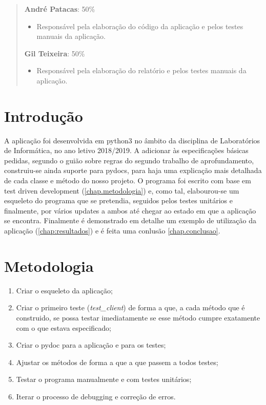 \documentclass{report}
\begin{document}
\renewcommand{\abstractname}{Contribuições dos autores}
\begin{abstract}
\textbf{André Patacas}: 50\%
\begin{itemize}
\item Responsável pela elaboração do código da aplicação e pelos testes manuais da aplicação.
\end{itemize}
\textbf{Gil Teixeira}: 50\%
\begin{itemize}
\item Responsável pela elaboração do relatório e pelos testes manuais da aplicação.
\end{itemize}
\end{abstract}

\chapter{Introdução}
\label{chap.introducao}

A aplicação foi desenvolvida em python3 no âmbito da disciplina de Laboratórios de Informática, no ano letivo 2018/2019. A adicionar às especificações básicas pedidas, segundo o guião sobre regras do segundo trabalho de aprofundamento, construiu-se ainda suporte para pydocs, para haja uma explicação mais detalhada de cada classe e método do nosso projeto. O programa foi escrito com base em test driven development  (\autoref{chap.metodologia}) e, como tal, elabourou-se um esqueleto do programa que se pretendia, seguidos pelos testes unitários e finalmente, por vários updates a ambos até chegar ao estado em que a aplicação se encontra. Finalmente é demonstrado em detalhe um exemplo de utilização da aplicação (\autoref{chap:resultados}) e é feita uma conlusão \autoref{chap.conclusao}.


\chapter{Metodologia}
\label{chap.metodologia}

\begin{enumerate}
	\item Criar o esqueleto da aplicação;
	\item Criar o primeiro teste (\textit{test\_client}) de forma a que, a cada método que é construido, se possa testar imediatamente se esse método cumpre exatamente com o que estava especificado;
	\item Criar o pydoc para a aplicação e para os testes;
	\item Ajustar os métodos de forma a que a que passem a todos testes;
	\item Testar o programa manualmente e com testes unitários;
	\item Iterar o processo de debugging e correção de erros.
\end{enumerate}
\end{document}
